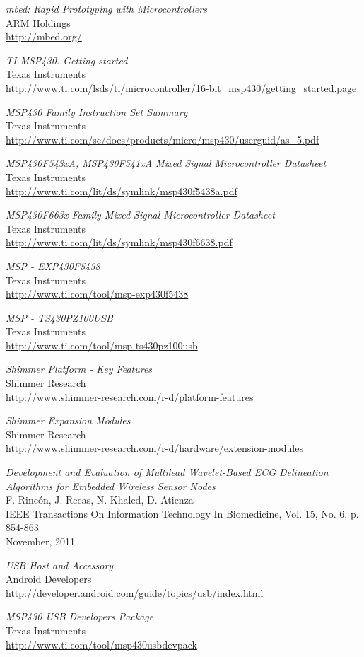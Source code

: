 \begin{thebibliography}{widest-label}
	\emph{mbed: Rapid Prototyping with Microcontrollers}\\
	ARM Holdings\\
	\url{http://mbed.org/}
	
	\emph{TI MSP430. Getting started}\\
	Texas Instruments\\
	\url{http://www.ti.com/lsds/ti/microcontroller/16-bit_msp430/getting_started.page}
	
	\emph{MSP430 Family Instruction Set Summary}\\
	Texas Instruments\\
	\url{http://www.ti.com/sc/docs/products/micro/msp430/userguid/as_5.pdf}
	
	\emph{MSP430F543xA, MSP430F541xA Mixed Signal Microcontroller Datasheet}\\
	Texas Instruments\\
	\url{http://www.ti.com/lit/ds/symlink/msp430f5438a.pdf}
	
	\emph{MSP430F663x Family Mixed Signal Microcontroller Datasheet}\\
	Texas Instruments\\
	\url{http://www.ti.com/lit/ds/symlink/msp430f6638.pdf}

	\emph{MSP - EXP430F5438}\\
	Texas Instruments\\
	\url{http://www.ti.com/tool/msp-exp430f5438}

	\emph{MSP - TS430PZ100USB}\\
	Texas Instruments\\
	\url{http://www.ti.com/tool/msp-ts430pz100usb}

	\emph{Shimmer Platform - Key Features}\\
	Shimmer Research\\
	\url{http://www.shimmer-research.com/r-d/platform-features}

	\emph{Shimmer Expansion Modules}\\
	Shimmer Research\\
	\url{http://www.shimmer-research.com/r-d/hardware/extension-modules}

	\emph{Development and Evaluation of Multilead Wavelet-Based ECG Delineation Algorithms for Embedded Wireless
		Sensor Nodes}\\
	F. Rincón, J. Recas, N. Khaled, D. Atienza\\
	IEEE Transactions On Information Technology In Biomedicine, Vol. 15, No. 6, p. 854-863\\
	November, 2011

	\emph{USB Host and Accessory}\\
	Android Developers\\
	\url{http://developer.android.com/guide/topics/usb/index.html}
	
	\emph{MSP430 USB Developers Package}\\
	Texas Instruments\\
	\url{http://www.ti.com/tool/msp430usbdevpack}

\end{thebibliography}
